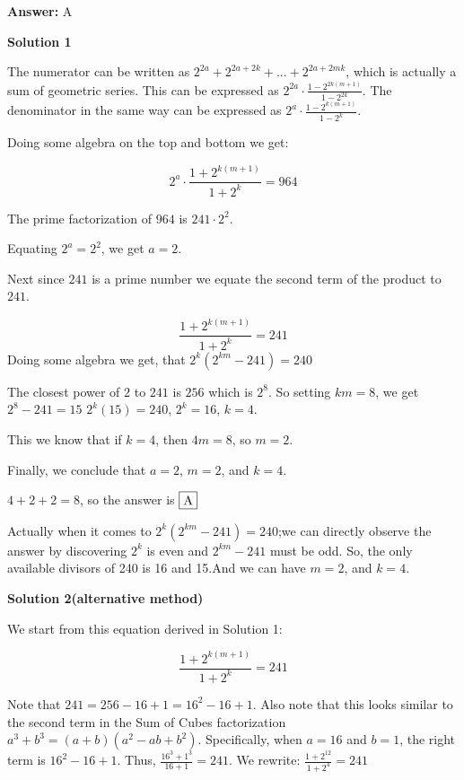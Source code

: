 \begin{enumerate}
 \textbf{Answer: }A



\textbf{Solution 1}

The numerator can be written as $2^{2a} +2^{2a+2k}+...+2^{2a+2mk}$, which is actually a sum of geometric series. This can be expressed as $2^{2a} \cdot \frac{1-2^{2k(m+1)}}{1-2^{2k}}$. The denominator in the same way can be expressed as $2^a \cdot \frac{1-2^{k(m+1)}}{1-2^k}$. 

 Doing some algebra on the top and bottom we get:

 \begin{equation}2^a \cdot \frac{1+2^{k(m+1)}}{1+2^k} = 964\end{equation}

 The prime factorization of $964$ is $241 \cdot 2^2$.

 Equating $2^a = 2^2$, we get $a = 2$.

 Next since $241$ is a prime number we equate the second term of the product to $241$.

 \begin{equation}\frac{1+2^{k(m+1)}}{1+2^k} = 241\end{equation}Doing some algebra we get, that $2^k(2^{km}-241) = 240$

 The closest power of $2$ to $241$ is $256$ which is $2^8$. So setting $km = 8$, we get $2^8-241 = 15$
$2^k(15) = 240$, $2^k = 16$, $k = 4$.

 This we know that if $k = 4$, then $4m = 8$, so $m = 2$.

 Finally, we conclude that $a = 2$, $m = 2$, and $k = 4$.

 
$4+2+2 = 8$, so the answer is $\fbox{A}$

 Actually when it comes to $2^k(2^{km}-241) = 240$;we can directly observe the answer by discovering $2^k$ is even and $2^{km}-241$ must be odd. So, the only available divisors of 240 is 16 and 15.And we can have $m = 2$, and $k = 4$.

 



\textbf{Solution 2(alternative method)}

We start from this equation derived in Solution 1:

 \begin{equation}\frac{1+2^{k(m+1)}}{1+2^k} = 241\end{equation}

 Note that $241=256-16+1=16^2-16+1$. Also note that this looks similar to the second term in the Sum of Cubes factorization $a^3+b^3=(a+b)(a^2-ab+b^2)$. Specifically, when $a=16$ and $b=1$, the right term is $16^2-16+1$. Thus, $\frac{16^3+1^3}{16+1}=241$. We rewrite: $\frac{1+2^{12}}{1+2^4}=241$


\end{enumerate}

